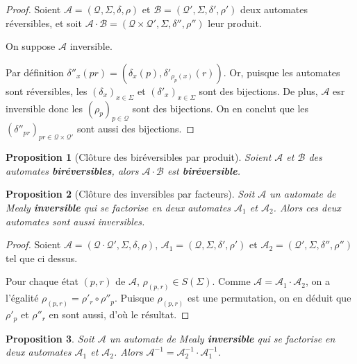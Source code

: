 \documentclass{article}
\newtheorem{prop}{Proposition}
\begin{document}
\begin{proof}
  Soient $\mathcal{A}=\left(\mathcal{Q}, \Sigma, \delta, \rho\right)$ et $\mathcal{B}=\left(\mathcal{Q'}, \Sigma, \delta', \rho'\right)$ deux automates réversibles, et soit $\mathcal{A\cdot B}=\left(\mathcal{Q\times Q'}, \Sigma, \delta'', \rho''\right)$ leur produit.


  On suppose $\mathcal{A}$ inversible.


  Par définition $\delta''_x(pr)=(\delta_x(p), \delta'_{\rho_p(x)}(r))$. Or, puisque les automates sont réversibles, les $(\delta_x)_{x\in\Sigma}$ et ${(\delta'_x)}_{x\in\Sigma}$ sont des bijections. De plus, $\mathcal{A}$ esr inversible donc les ${(\rho_p)}_{p\in \mathcal{Q}}$ sont des bijections. On en conclut que les ${(\delta''_{pr})}_{pr\in\mathcal{Q}\times\mathcal{Q'}}$ sont aussi des bijections.
\end{proof}

\begin{prop}[Clôture des biréversibles par produit]
  Soient $\mathcal{A}$ et $\mathcal{B}$ des automates \textbf{biréversibles}, alors $\mathcal{A}\cdot\mathcal{B}$ est \textbf{biréversible}.
\end{prop}

\begin{prop}[Clôture des inversibles par facteurs]\label{prop_cloture_inv_facteurs}
  Soit $\mathcal{A}$ un automate de Mealy \textbf{inversible} qui se factorise en deux automates $\mathcal{A}_1$ et $\mathcal{A}_2$. Alors ces deux automates sont aussi inversibles.
\end{prop}

\begin{proof}
  Soient $\mathcal{A}=\left(\mathcal{Q\cdot Q'}, \Sigma, \delta, \rho\right)$, $\mathcal{A}_1=\left(\mathcal{Q}, \Sigma, \delta', \rho'\right)$ et $\mathcal{A}_2=\left(\mathcal{Q'}, \Sigma, \delta'', \rho''\right)$ tel que ci dessus.

  Pour chaque état $(p, r)$ de $\mathcal{A}$, $\rho_{(p, r)}\in S(\Sigma)$. Comme $\mathcal{A}=\mathcal{A}_1\cdot\mathcal{A}_2$, on a l'égalité $\rho_{(p, r)}=\rho'_r\circ\rho''_p$. Puisque $\rho_{(p, r)}$ est une permutation, on en déduit que $\rho'_p$ et $\rho''_r$ en sont aussi, d'où le résultat.
\end{proof}

\begin{prop}\label{prop_inverse_produit}
    Soit $\mathcal{A}$ un automate de Mealy \textbf{inversible} qui se factorise en deux automates $\mathcal{A}_1$ et $\mathcal{A}_2$.
    Alors $\mathcal{A}^{-1} = \mathcal{A}_2^{-1} \cdot \mathcal{A}_1^{-1}$.
\end{prop}
\end{document}
